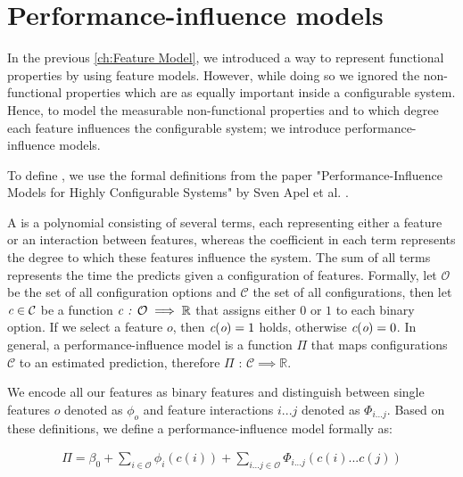 \section{Performance-influence models}\label{ch:performance-influence-models}
In the previous \autoref{ch:Feature Model}, we introduced a way to represent functional properties by using feature models.
However, while doing so we ignored the non-functional properties which are as equally important inside a configurable system.
Hence, to model the measurable non-functional properties and to which degree each feature influences the configurable system; 
we introduce performance-influence models. 

To define {\perfInfluenceModel}, we use the formal definitions from the paper "Performance-Influence Models for
Highly Configurable Systems" by Sven Apel et al. \cite{Performance-influence-models-for-highly-configurable-systems}.

A {\perfInfluenceModel} is a polynomial consisting of several terms, each representing either a feature or an interaction between features, 
whereas the coefficient in each term represents the degree to which these features influence the system.  
The sum of all terms represents the time the {\perfInfluenceModel} predicts given a configuration of features.
Formally, let $\mathcal{O}$ be the set of all configuration options and $\mathcal{C}$ the set of all configurations, 
then let $\emph{c} \in \mathcal{C}$ be a function $\emph{c} \textit{ : } \mathcal{O} \implies \mathbb{R}$ that assigns either $0$ or $1$ to each binary option. 
If we select a feature $o$, then $\emph{c}(\emph{o}) = 1$ holds, otherwise $\emph{c}(\emph{o}) = 0$. 
In general, a performance-influence model is a function $\Pi$ that maps configurations $\mathcal{C}$ to an estimated prediction, 
therefore $\Pi \textit{ : } \mathcal{C} \implies \mathbb{R}$.

We encode all our features as binary features and distinguish between single features $o$ denoted as $\phi_o$ and feature interactions $i ... j$ denoted as $\Phi_{i...j}$. 
Based on these definitions, we define a performance-influence model formally as:

\begin{gather}
    \Pi = \beta_0 + \sum_{i \in \mathcal{O}} \phi_i(c(i)) + \sum_{i...j \in \mathcal{O}} \Phi_{i...j}(c(i)...c(j))
\end{gather}

